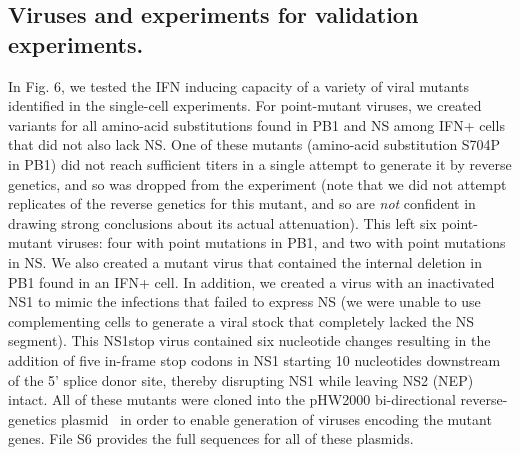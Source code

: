 \documentclass[]{article}
\begin{document}
\subsection*{Viruses and experiments for validation experiments.}
In Fig. 6, we tested the IFN inducing capacity of a variety of viral mutants identified in the single-cell experiments.
For point-mutant viruses, we created variants for all amino-acid substitutions found in PB1 and NS among IFN+ cells that did not also lack NS.
One of these mutants (amino-acid substitution S704P in PB1) did not reach sufficient titers in a single attempt to generate it by reverse genetics, and so was dropped from the experiment (note that we did not attempt replicates of the reverse genetics for this mutant, and so are \emph{not} confident in drawing strong conclusions about its actual attenuation).
This left six point-mutant viruses: four with point mutations in PB1, and two with point mutations in NS.
We also created a mutant virus that contained the internal deletion in PB1 found in an IFN+ cell.
In addition, we created a virus with an inactivated NS1 to mimic the infections that failed to express NS (we were unable to use complementing cells to generate a viral stock that completely lacked the NS segment).
This NS1stop virus contained six nucleotide changes resulting in the addition of five in-frame stop codons in NS1 starting 10 nucleotides downstream of the 5' splice donor site, thereby disrupting NS1 while leaving NS2 (NEP) intact.
All of these mutants were cloned into the pHW2000 bi-directional reverse-genetics plasmid~\cite{hoffmann2000dna} in order to enable generation of viruses encoding the mutant genes.
 File S6 provides the full sequences for all of these plasmids.
\end{document}
